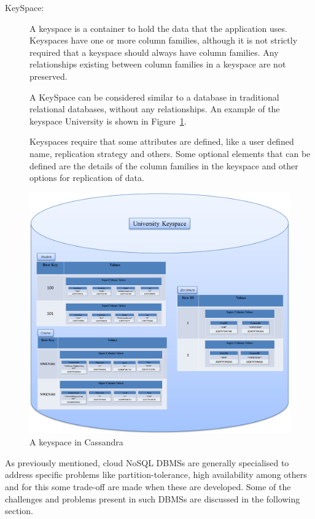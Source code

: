 \begin{description}
\item [KeySpace:] A keyspace is a container to hold the data that the
application uses.  Keyspaces have one or more column families,   although it is not strictly
required that a keyspace should always have column families.  Any relationships
existing between column families in a keyspace are not preserved. 

A KeySpace can be considered similar to a database in traditional relational
databases,   without any relationships.  An example of the keyspace
University is shown in Figure~\ref{f:keyspace}. 

Keyspaces require that some attributes are defined,   like a user defined name,  
replication strategy and others.  Some optional elements that can be defined are
the details of the column families in the keyspace and other options
for replication of data. 
\end{description}


\begin{figure}[H]
	\centering
	\includegraphics[width=.9\textwidth]{./figure/Example/KEYSPACE.png}
	\caption{A keyspace in
	Cassandra}\label{f:keyspace}
\end{figure}

As previously mentioned,  cloud \ac{NoSQL}
\acp{DBMS} are generally specialised to address specific problems like
partition-tolerance,  high availability among others and for this some
trade-off are made when these are developed.
Some of the challenges and problems present in such \acp{DBMS} are discussed in the following section.

